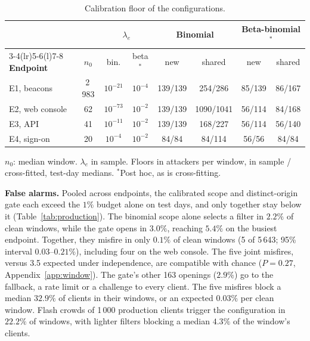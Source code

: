 \documentclass[conference,letterpaper,10pt]{IEEEtran}
\newcommand\1{\textit{(i)}}
\newcommand\2{\textit{(ii)}}
\newcommand\3{\textit{(iii)}}
\newcommand\4{\textit{(iv)}}
\newcommand\5{\textit{(v)}}
\newcommand\6{\textit{(vi)}}
\newcommand\7{\textit{(vii)}}
\newcommand\8{\textit{(viii)}}
\newcommand\9{\textit{(ix)}}
\begin{document}
\begin{table}[t]
\centering
\caption{Calibration floor of the configurations.}
\label{tab:floor}
\scriptsize
\setlength{\tabcolsep}{2.2pt}
\begin{tabular}{@{}lccccccc@{}}
\toprule
 & & \multicolumn{2}{c}{$\lambda_e$} & \multicolumn{2}{c}{\textbf{Binomial}} & \multicolumn{2}{c}{\textbf{Beta-binomial}$^{*}$} \\
\cmidrule(lr){3-4}\cmidrule(lr){5-6}\cmidrule(l){7-8}
\textbf{Endpoint} & $n_0$ & bin. & beta$^{*}$ & new & shared & new & shared \\
\midrule
E1, beacons     & 2\,983  & $10^{-21}$ & $10^{-4}$ & 139/139 & 254/286 & 85/139 & 86/167 \\
E2, web console & 62      & $10^{-73}$ & $10^{-2}$ & 139/139 & 1090/1041 & 56/114 & 84/168 \\
E3, API         & 41      & $10^{-11}$ & $10^{-2}$ & 139/139 & 168/227 & 56/114 & 56/140 \\
E4, sign-on     & 20      & $10^{-4}$ & $10^{-2}$ & 84/84 & 84/114 & 56/56 & 84/84 \\
\bottomrule
\end{tabular}

\vspace{2pt}
{\footnotesize $n_0$: median window. $\lambda_e$ in sample. Floors in attackers per window, in sample / cross-fitted, test-day medians. $^{*}$Post hoc, as is cross-fitting.}
\end{table}

\textbf{False alarms.}
Pooled across endpoints, the calibrated scope and
distinct-origin gate each exceed the $1\%$ budget alone on
test days, and only together stay below it
(Table~\ref{tab:production}). The binomial scope alone
selects a filter in $2.2\%$ of clean windows, while
the gate opens in $3.0\%$, reaching $5.4\%$ on the
busiest endpoint. Together, they misfire in only
$0.1\%$ of clean windows (5 of 5\,643; 95\% interval
$0.03$--$0.21\%$), including four on the web console.
The five joint misfires, versus 3.5 expected under
independence, are compatible with chance
($P = 0.27$, Appendix~\ref{app:window}).
The gate's other 163 openings ($2.9\%$) go to the fallback,
a rate limit or a challenge to every client. The five
misfires block a median $32.9\%$ of clients in their
windows,
or an expected $0.03\%$ per clean window.
Flash crowds of 1\,000 production clients trigger
the configuration in $22.2\%$ of windows, with lighter
filters blocking a median $4.3\%$ of the window's clients.
\end{document}
